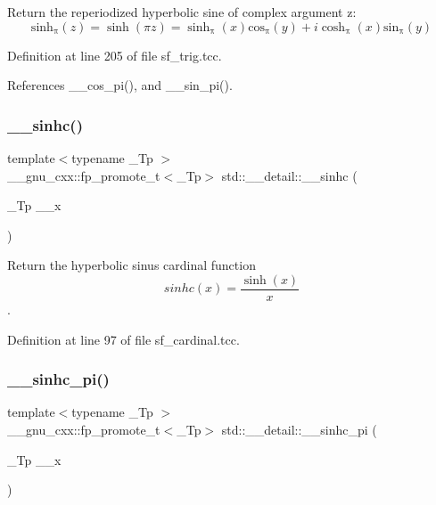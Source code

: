 Return the reperiodized hyperbolic sine of complex argument z\+: \[ \mathrm{sinh_\pi}(z) = \sinh(\pi z) = \mathrm{\sinh_\pi}(x) \mathrm{cos_\pi}(y) + i \mathrm{\cosh_\pi}(x) \mathrm{sin_\pi}(y) \] 

Definition at line 205 of file sf\+\_\+trig.\+tcc.



References \+\_\+\+\_\+cos\+\_\+pi(), and \+\_\+\+\_\+sin\+\_\+pi().

\mbox{\label{namespacestd_1_1____detail_a65db661ebfae979e916e2f4481e6866c}} 
\subsubsection{\texorpdfstring{\+\_\+\+\_\+sinhc()}{\_\_sinhc()}}
{\footnotesize\ttfamily template$<$typename \+\_\+\+Tp $>$ \\
\+\_\+\+\_\+gnu\+\_\+cxx\+::fp\+\_\+promote\+\_\+t$<$\+\_\+\+Tp$>$ std\+::\+\_\+\+\_\+detail\+::\+\_\+\+\_\+sinhc (\begin{DoxyParamCaption}\item[{\+\_\+\+Tp}]{\+\_\+\+\_\+x }\end{DoxyParamCaption})}



Return the hyperbolic sinus cardinal function \[ sinhc(x) = \frac{\sinh(x)}{x} \]. 



Definition at line 97 of file sf\+\_\+cardinal.\+tcc.

\mbox{\label{namespacestd_1_1____detail_a3478d06aa615f1efb0fd86fd4eb59195}} 
\subsubsection{\texorpdfstring{\+\_\+\+\_\+sinhc\+\_\+pi()}{\_\_sinhc\_pi()}}
{\footnotesize\ttfamily template$<$typename \+\_\+\+Tp $>$ \\
\+\_\+\+\_\+gnu\+\_\+cxx\+::fp\+\_\+promote\+\_\+t$<$\+\_\+\+Tp$>$ std\+::\+\_\+\+\_\+detail\+::\+\_\+\+\_\+sinhc\+\_\+pi (\begin{DoxyParamCaption}\item[{\+\_\+\+Tp}]{\+\_\+\+\_\+x }\end{DoxyParamCaption})}



